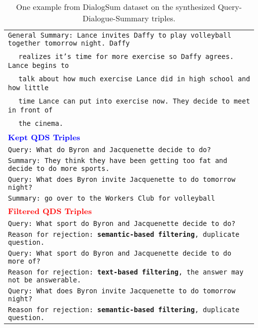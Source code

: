 \documentclass[11pt]{article}
\begin{document}
\begin{table*}[t]
\begin{adjustbox}{width=1.00\textwidth,center}
\begin{tabular}{ | l |}
        \texttt{General Summary: Lance invites Daffy to play volleyball together tomorrow night. Daffy} \\
        \quad\quad\quad\quad\quad\quad\quad\quad~~ \texttt{realizes it's time for more exercise so Daffy agrees. Lance begins to } \\
        \quad\quad\quad\quad\quad\quad\quad\quad~~ \texttt{talk about how much exercise Lance did in high school and how little} \\
        \quad\quad\quad\quad\quad\quad\quad\quad~~ \texttt{time Lance can put into exercise now. They decide to meet in front of} \\
        \quad\quad\quad\quad\quad\quad\quad\quad~~ \texttt{the cinema.}\\
        
        
        
        \hline \hline
        \textbf{\textcolor{blue}{Kept QDS Triples}}\\ 
        \hline
        \texttt{Query: What do Byron and Jacquenette decide to do?} \\
        \texttt{Summary: They think they have been getting too fat and decide to do more sports.} \\ \hline
        \texttt{Query: What does Byron invite Jacquenette to do tomorrow night?} \\
        \texttt{Summary: go over to the Workers Club for volleyball }\\
        \hline \hline
        \textbf{\textcolor{red}{Filtered QDS Triples}} \\ 
        \hline
        \texttt{Query: What sport do Byron and Jacquenette decide to do? }\\
        \texttt{Reason for rejection: \textbf{semantic-based filtering}, duplicate question.} \\ \hline
        \texttt{Query: What sport do Byron and Jacquenette decide to do more of? }\\
        \texttt{Reason for rejection: \textbf{text-based filtering}, the answer may not be answerable.} \\ \hline
        \texttt{Query: What does Byron invite Jacquenette to do tomorrow night? }\\
        \texttt{Reason for rejection: \textbf{semantic-based filtering}, duplicate question.} \\
        \bottomrule
        \end{tabular}
        \end{adjustbox}
        \caption{One example from DialogSum dataset on the synthesized Query-Dialogue-Summary triples.}
        \label{tab:QDS_examples_dialogsum}
    \end{table*}
\end{document}
